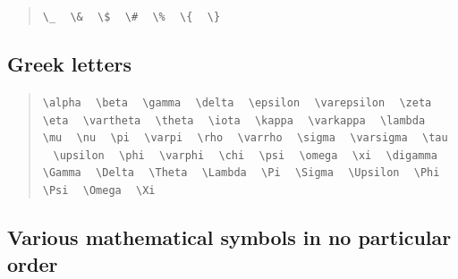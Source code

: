 \documentclass{article}
\newcommand{\texcommand}[1]{\textbackslash{}#1}
\newcommand{\spacer}{\,\,\, \hfil}
\newcommand{\lastspacer}{\hfill\hfill\hfill}
\newenvironment{mylist}{\begin{quote}}{\end{quote}}
\begin{document}
\begin{mylist}
\texttt{\texcommand{\_}} \spacer
\texttt{\texcommand{\&}} \spacer
\texttt{\texcommand{\$}} \spacer
\texttt{\texcommand{\#}} \spacer
\texttt{\texcommand{\%}} \spacer
\texttt{\texcommand{\{}} \spacer
\texttt{\texcommand{\}}} \lastspacer
\end{mylist}

\subsection{Greek letters}

\begin{mylist}
\texttt{\texcommand{alpha}} \spacer
\texttt{\texcommand{beta}} \spacer
\texttt{\texcommand{gamma}} \spacer
\texttt{\texcommand{delta}} \spacer
\texttt{\texcommand{epsilon}} \spacer
\texttt{\texcommand{varepsilon}} \spacer
\texttt{\texcommand{zeta}} \spacer
\texttt{\texcommand{eta}} \spacer
\texttt{\texcommand{vartheta}} \spacer
\texttt{\texcommand{theta}} \spacer
\texttt{\texcommand{iota}} \spacer
\texttt{\texcommand{kappa}} \spacer
\texttt{\texcommand{varkappa}} \spacer
\texttt{\texcommand{lambda}} \spacer
\texttt{\texcommand{mu}} \spacer
\texttt{\texcommand{nu}} \spacer
\texttt{\texcommand{pi}} \spacer
\texttt{\texcommand{varpi}} \spacer
\texttt{\texcommand{rho}} \spacer
\texttt{\texcommand{varrho}} \spacer
\texttt{\texcommand{sigma}} \spacer
\texttt{\texcommand{varsigma}} \spacer
\texttt{\texcommand{tau}} \spacer
\texttt{\texcommand{upsilon}} \spacer
\texttt{\texcommand{phi}} \spacer
\texttt{\texcommand{varphi}} \spacer
\texttt{\texcommand{chi}} \spacer
\texttt{\texcommand{psi}} \spacer
\texttt{\texcommand{omega}} \spacer
\texttt{\texcommand{xi}} \spacer
\texttt{\texcommand{digamma}} \spacer
\texttt{\texcommand{Gamma}} \spacer
\texttt{\texcommand{Delta}} \spacer
\texttt{\texcommand{Theta}} \spacer
\texttt{\texcommand{Lambda}} \spacer
\texttt{\texcommand{Pi}} \spacer
\texttt{\texcommand{Sigma}} \spacer
\texttt{\texcommand{Upsilon}} \spacer
\texttt{\texcommand{Phi}} \spacer
\texttt{\texcommand{Psi}} \spacer
\texttt{\texcommand{Omega}} \spacer
\texttt{\texcommand{Xi}} \lastspacer
\end{mylist}

\subsection{Various mathematical symbols in no particular order}
\end{document}
